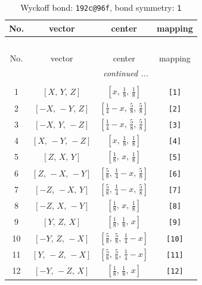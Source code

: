 \documentclass[fleqn,8pt]{jsarticle}
\begin{document}
\begin{longtable}{cccc}
\caption{Wyckoff bond: {\tt 192c@96f}, bond symmetry: {\tt 1}}
 \\
 \hline \hline
No. & vector & center & mapping \\ \hline \endfirsthead

\multicolumn{3}{l}{\tablename\ \thetable{}} \\
 \hline \hline
No. & vector & center & mapping \\ \hline \endhead

 \hline \hline
\multicolumn{3}{r}{\footnotesize\it continued ...} \\ \endfoot

 \hline \hline
\multicolumn{3}{r}{} \\ \endlastfoot

1 & $\left[ X,\, Y,\, Z \right]$ & $\left[ x,\, \frac{1}{8},\, \frac{1}{8} \right]$ & {\tt [1]} \\ \hline
2 & $\left[ - X,\, - Y,\, Z \right]$ & $\left[ \frac{1}{4} - x,\, \frac{5}{8},\, \frac{5}{8} \right]$ & {\tt [2]} \\ \hline
3 & $\left[ - X,\, Y,\, - Z \right]$ & $\left[ \frac{1}{4} - x,\, \frac{5}{8},\, \frac{5}{8} \right]$ & {\tt [3]} \\ \hline
4 & $\left[ X,\, - Y,\, - Z \right]$ & $\left[ x,\, \frac{1}{8},\, \frac{1}{8} \right]$ & {\tt [4]} \\ \hline
5 & $\left[ Z,\, X,\, Y \right]$ & $\left[ \frac{1}{8},\, x,\, \frac{1}{8} \right]$ & {\tt [5]} \\ \hline
6 & $\left[ Z,\, - X,\, - Y \right]$ & $\left[ \frac{5}{8},\, \frac{1}{4} - x,\, \frac{5}{8} \right]$ & {\tt [6]} \\ \hline
7 & $\left[ - Z,\, - X,\, Y \right]$ & $\left[ \frac{5}{8},\, \frac{1}{4} - x,\, \frac{5}{8} \right]$ & {\tt [7]} \\ \hline
8 & $\left[ - Z,\, X,\, - Y \right]$ & $\left[ \frac{1}{8},\, x,\, \frac{1}{8} \right]$ & {\tt [8]} \\ \hline
9 & $\left[ Y,\, Z,\, X \right]$ & $\left[ \frac{1}{8},\, \frac{1}{8},\, x \right]$ & {\tt [9]} \\ \hline
10 & $\left[ - Y,\, Z,\, - X \right]$ & $\left[ \frac{5}{8},\, \frac{5}{8},\, \frac{1}{4} - x \right]$ & {\tt [10]} \\ \hline
11 & $\left[ Y,\, - Z,\, - X \right]$ & $\left[ \frac{5}{8},\, \frac{5}{8},\, \frac{1}{4} - x \right]$ & {\tt [11]} \\ \hline
12 & $\left[ - Y,\, - Z,\, X \right]$ & $\left[ \frac{1}{8},\, \frac{1}{8},\, x \right]$ & {\tt [12]} \\ \hline

\end{longtable}
\end{document}
